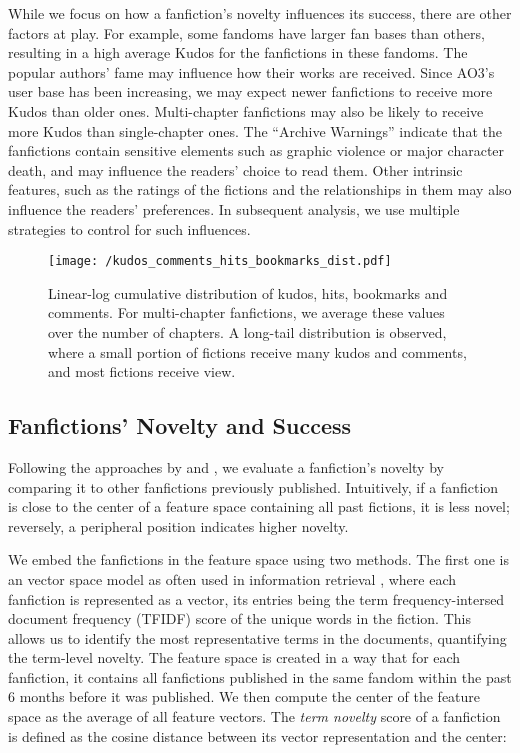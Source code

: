 \documentclass[a4paper]{article}
\begin{document}
While we focus on how a fanfiction's novelty influences its success, there are other factors at play. For example, some fandoms have larger fan bases than others, resulting in a high average Kudos for the fanfictions in these fandoms. The popular authors' fame may influence how their works are received. Since AO3's user base has been increasing, we may expect newer fanfictions to receive more Kudos than older ones. Multi-chapter fanfictions may also be likely to receive more Kudos than single-chapter ones. The ``Archive Warnings'' indicate that the fanfictions contain sensitive elements such as graphic violence or major character death, and may influence the readers' choice to read them.  Other intrinsic features, such as the ratings of the fictions and the relationships in them may also influence the readers' preferences. In subsequent analysis, we use multiple strategies to control for such influences.

\begin{figure}
    \centering
        \texttt{[image: /kudos\_comments\_hits\_bookmarks\_dist.pdf]}
        \caption{Linear-log cumulative distribution of kudos, hits, bookmarks and comments. For multi-chapter fanfictions, we average these values over the number of chapters. A long-tail distribution is observed, where a small portion of fictions receive many kudos and comments, and most fictions receive view.}
        \label{fig:kudos_dist}
\end{figure}


\subsection*{Fanfictions' Novelty and Success}
Following the approaches by \cite{askin2017makes} and \cite{de2015game}, we evaluate a fanfiction's novelty by comparing it to other fanfictions previously published. Intuitively, if a fanfiction is close to the center of a feature space containing all past fictions, it is less novel; reversely, a peripheral position indicates higher novelty. 

We embed the fanfictions in the feature space using two methods. The first one is an vector space model as often used in information retrieval \cite{turney2010frequency}, where each fanfiction is represented as a vector, its entries being the term frequency-intersed document frequency (TFIDF) score of the unique words in the fiction. This allows us to identify the most representative terms in the documents, quantifying the term-level novelty. The feature space is created in a way that for each fanfiction, it contains all fanfictions published in the same fandom within the past 6 months before it was published. We then compute the center of the feature space as the average of all feature vectors. The \emph{term novelty} score of a fanfiction is defined as the cosine distance between its vector representation and the center:
\end{document}
